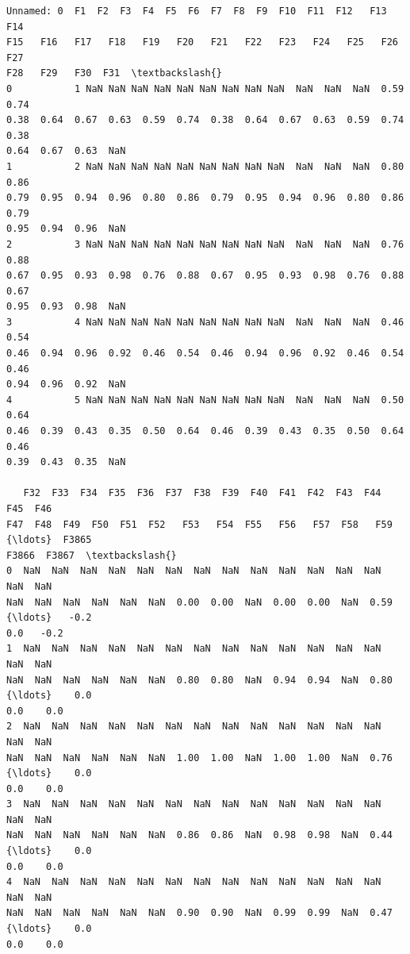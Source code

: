 \documentclass[11pt]{article}
\makeatletter
\newcommand{\boxspacing}{\kern\kvtcb@left@rule\kern\kvtcb@boxsep}
\newcommand{\prompt}[4]{
        {\ttfamily\llap{{\color{#2}[#3]:\hspace{3pt}#4}}\vspace{-\baselineskip}}
    }
\makeatother
\begin{document}
            \begin{tcolorbox}[breakable, size=fbox, boxrule=.5pt, pad at break*=1mm, opacityfill=0]
\prompt{Out}{outcolor}{26}{\boxspacing}
\begin{Verbatim}[commandchars=\\\{\}]
   Unnamed: 0  F1  F2  F3  F4  F5  F6  F7  F8  F9  F10  F11  F12   F13   F14
F15   F16   F17   F18   F19   F20   F21   F22   F23   F24   F25   F26   F27
F28   F29   F30  F31  \textbackslash{}
0           1 NaN NaN NaN NaN NaN NaN NaN NaN NaN  NaN  NaN  NaN  0.59  0.74
0.38  0.64  0.67  0.63  0.59  0.74  0.38  0.64  0.67  0.63  0.59  0.74  0.38
0.64  0.67  0.63  NaN
1           2 NaN NaN NaN NaN NaN NaN NaN NaN NaN  NaN  NaN  NaN  0.80  0.86
0.79  0.95  0.94  0.96  0.80  0.86  0.79  0.95  0.94  0.96  0.80  0.86  0.79
0.95  0.94  0.96  NaN
2           3 NaN NaN NaN NaN NaN NaN NaN NaN NaN  NaN  NaN  NaN  0.76  0.88
0.67  0.95  0.93  0.98  0.76  0.88  0.67  0.95  0.93  0.98  0.76  0.88  0.67
0.95  0.93  0.98  NaN
3           4 NaN NaN NaN NaN NaN NaN NaN NaN NaN  NaN  NaN  NaN  0.46  0.54
0.46  0.94  0.96  0.92  0.46  0.54  0.46  0.94  0.96  0.92  0.46  0.54  0.46
0.94  0.96  0.92  NaN
4           5 NaN NaN NaN NaN NaN NaN NaN NaN NaN  NaN  NaN  NaN  0.50  0.64
0.46  0.39  0.43  0.35  0.50  0.64  0.46  0.39  0.43  0.35  0.50  0.64  0.46
0.39  0.43  0.35  NaN

   F32  F33  F34  F35  F36  F37  F38  F39  F40  F41  F42  F43  F44  F45  F46
F47  F48  F49  F50  F51  F52   F53   F54  F55   F56   F57  F58   F59  {\ldots}  F3865
F3866  F3867  \textbackslash{}
0  NaN  NaN  NaN  NaN  NaN  NaN  NaN  NaN  NaN  NaN  NaN  NaN  NaN  NaN  NaN
NaN  NaN  NaN  NaN  NaN  NaN  0.00  0.00  NaN  0.00  0.00  NaN  0.59  {\ldots}   -0.2
0.0   -0.2
1  NaN  NaN  NaN  NaN  NaN  NaN  NaN  NaN  NaN  NaN  NaN  NaN  NaN  NaN  NaN
NaN  NaN  NaN  NaN  NaN  NaN  0.80  0.80  NaN  0.94  0.94  NaN  0.80  {\ldots}    0.0
0.0    0.0
2  NaN  NaN  NaN  NaN  NaN  NaN  NaN  NaN  NaN  NaN  NaN  NaN  NaN  NaN  NaN
NaN  NaN  NaN  NaN  NaN  NaN  1.00  1.00  NaN  1.00  1.00  NaN  0.76  {\ldots}    0.0
0.0    0.0
3  NaN  NaN  NaN  NaN  NaN  NaN  NaN  NaN  NaN  NaN  NaN  NaN  NaN  NaN  NaN
NaN  NaN  NaN  NaN  NaN  NaN  0.86  0.86  NaN  0.98  0.98  NaN  0.44  {\ldots}    0.0
0.0    0.0
4  NaN  NaN  NaN  NaN  NaN  NaN  NaN  NaN  NaN  NaN  NaN  NaN  NaN  NaN  NaN
NaN  NaN  NaN  NaN  NaN  NaN  0.90  0.90  NaN  0.99  0.99  NaN  0.47  {\ldots}    0.0
0.0    0.0


\end{Verbatim}
\end{tcolorbox}
\end{document}

